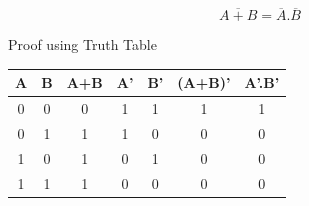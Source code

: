\documentclass{beamer}
\begin{document}
\begin{frame}
\begin{equation*}
                \overline{A+B} = \overline{A}.\overline{B}
\end{equation*}
        \begin{block}{Proof using Truth Table}
                \begin{tabular}{|c|c||c||c||c||c||c|}
                        \hline
                         \textbf{A} &
                        \textbf{B} & \textbf{A+B} &\textbf{A'} &
                        \textbf{B'} &\textbf{(A+B)'} & \textbf{A'.B'}\\
                        \hline
                        \hline
                         0 & 0 & 0 & 1 & 1 & 1 & 1\\
                        \hline
                         0 & 1 & 1 & 1 & 0 & 0 & 0 \\
                        \hline
                         1 & 0 & 1 & 0 & 1 & 0 & 0 \\
                        \hline
                         1 & 1 & 1 & 0 & 0 & 0 & 0 \\
                        \hline
                \end{tabular}
        \end{block}
\end{frame}
\end{document}
